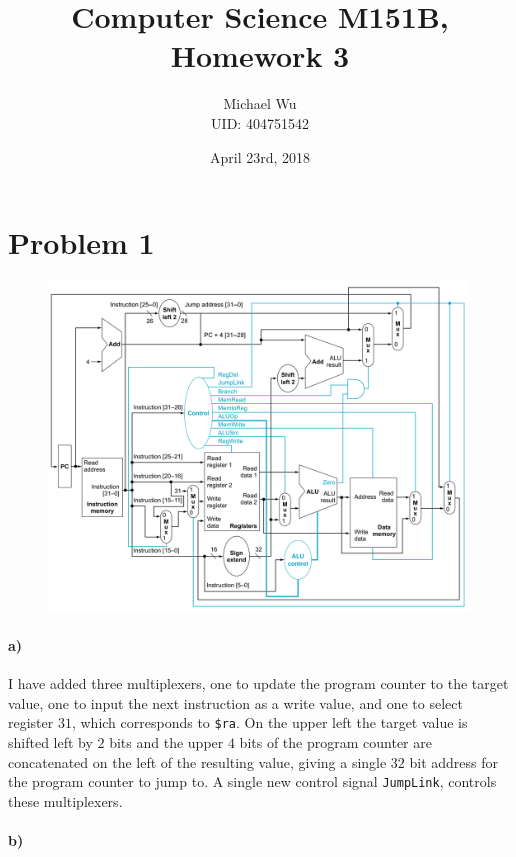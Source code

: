 \documentclass[12pt]{article}
\begin{document}
\title{Computer Science M151B, Homework 3}
\date{April 23rd, 2018}
\author{Michael Wu\\UID: 404751542}
\maketitle

\section*{Problem 1}

\begin{figure}[!ht]
    \begin{center}
        \includegraphics[width=4.4in]{problem1a.png}
    \end{center}
\end{figure}

\paragraph{a)}

I have added three multiplexers, one to update the program counter to the target value, one to input the next instruction as a write
value, and one to select register \(31\), which corresponds to \texttt{\$ra}. On the upper left the target value is shifted left by \(2\)
bits and the upper \(4\) bits of the program counter are concatenated on the left of the resulting value, giving a single \(32\) bit address
for the program counter to jump to. A single new control signal \texttt{JumpLink}, controls these multiplexers.

\paragraph{b)}
\end{document}
